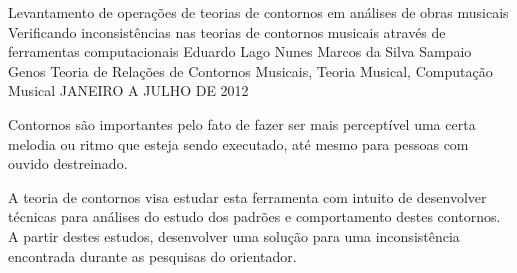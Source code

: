 \documentclass[11pt]{article}
\begin{document}
\graphicspath{{figs/}}


\dadosRelatorioFinal
{Levantamento de operações de teorias de contornos em análises de
  obras musicais}
{Verificando inconsistências nas teorias de contornos musicais através
  de ferramentas computacionais }
{Eduardo Lago Nunes}
{Marcos da Silva Sampaio}
{Genos}
{Teoria de Relações de Contornos Musicais, Teoria Musical, Computação Musical}
{JANEIRO A JULHO DE 2012}


\newpage

\setcounter{page}{1}
\onehalfspace






\label{sec:introducao}

Contornos são importantes pelo fato de fazer ser mais perceptível uma
certa melodia ou ritmo que esteja sendo executado, até mesmo para
pessoas com ouvido destreinado.


A teoria de contornos visa estudar esta ferramenta com intuito de
desenvolver técnicas para análises do estudo dos padrões e
comportamento destes contornos.
A partir destes estudos, desenvolver uma solução para uma
inconsistência encontrada durante as pesquisas do orientador.
\end{document}
